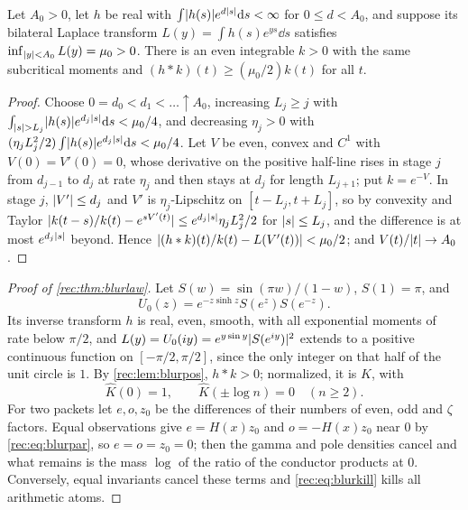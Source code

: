 \begin{lemma}\label{rec:lem:blurpos}
Let $A_0>0$, let $h$ be real with $\int\lvert h(s)\rvert e^{d\lvert s\rvert}\mathrm{d} s<\infty$ for $0\le d<A_0$, and suppose its bilateral Laplace
transform $L(y)=\int h(s)e^{ys}\dd s$ satisfies $\inf_{\lvert y\rvert<A_0}L(y)=\mu_0>0$. There is an even integrable $k>0$ with the same
subcritical moments and $(h*k)(t)\ge(\mu_0/2)k(t)$ for all $t$.
\end{lemma}

\begin{proof}
Choose $0=d_0<d_1<\dots\uparrow A_0$, increasing $L_j\ge j$ with $\int_{\lvert s\rvert>L_j}\lvert h(s)\rvert e^{d_j\lvert s\rvert}\mathrm{d} s<\mu_0/4$, and decreasing $\eta_j>0$
with $(\eta_jL_j^2/2)\int\lvert h(s)\rvert e^{d_j\lvert s\rvert}\mathrm{d} s<\mu_0/4$. Let $V$ be even, convex and $C^1$ with $V(0)=V'(0)=0$, whose derivative on
the positive half-line rises in stage $j$ from $d_{j-1}$ to $d_j$ at rate $\eta_j$ and then stays at $d_j$ for length $L_{j+1}$; put
$k=e^{-V}$. In stage $j$, $\lvert V'\rvert\le d_j$ and $V'$ is $\eta_j$-Lipschitz on $[t-L_j,t+L_j]$, so by convexity and Taylor
$\lvert k(t-s)/k(t)-e^{sV'(t)}\rvert\le e^{d_j\lvert s\rvert}\eta_jL_j^2/2$ for $\lvert s\rvert\le L_j$, and the difference is at most $e^{d_j\lvert s\rvert}$ beyond. Hence
$\lvert(h*k)(t)/k(t)-L(V'(t))\rvert<\mu_0/2$; and $V(t)/\lvert t\rvert\to A_0$.
\end{proof}

\begin{proof}[Proof of \cref{rec:thm:blurlaw}]
Let $S(w)=\sin(\pi w)/(1-w)$, $S(1)=\pi$, and
\[
 U_0(z)=e^{-z\sinh z}S(e^z)S(e^{-z}).
\]
Its inverse transform $h$ is real, even, smooth,
with all exponential moments of rate below $\pi/2$, and $L(y)=U_0(iy)=e^{y\sin y}\lvert S(e^{iy})\rvert^2$ extends to a positive
continuous function on $[-\pi/2,\pi/2]$, since the only integer on that half of the unit circle is $1$. By
\cref{rec:lem:blurpos}, $h*k>0$; normalized, it is $K$, with
\begin{equation}\label{rec:eq:blurkill}
 \widehat K(0)=1,\qquad\widehat K(\pm\log n)=0\quad(n\ge2).
\end{equation}
For two packets let $e,o,z_0$ be the differences of their numbers of even, odd and $\zeta$ factors. Equal
observations give $e=H(x)z_0$ and $o=-H(x)z_0$ near $0$ by \eqref{rec:eq:blurpar}, so $e=o=z_0=0$; then the gamma and pole
densities cancel and what remains is the mass $\log$ of the ratio of the conductor products at $0$.
Conversely, equal invariants cancel these terms and \eqref{rec:eq:blurkill} kills all arithmetic atoms.
\end{proof}

